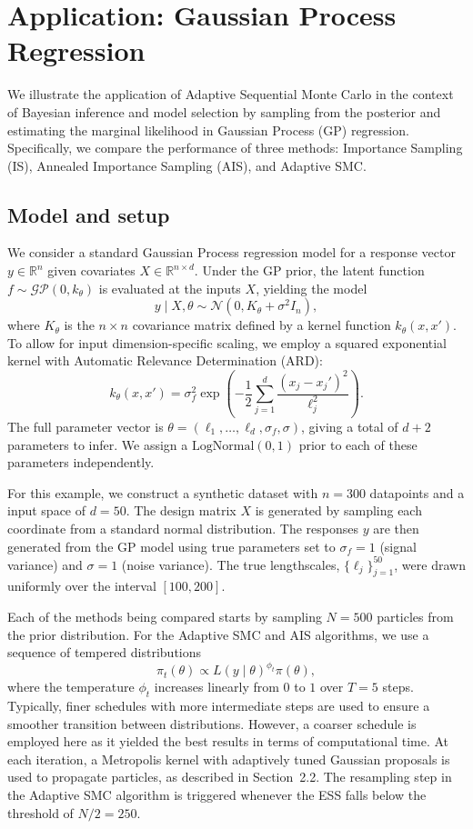 \documentclass[a4paper, 12pt]{article}
\begin{document}
    \section{Application: Gaussian Process Regression}

    We illustrate the application of Adaptive Sequential Monte Carlo in the context of Bayesian inference and model selection by sampling from the posterior and estimating the marginal likelihood in Gaussian Process (GP) regression. Specifically, we compare the performance of three methods: Importance Sampling (IS), Annealed Importance Sampling (AIS), and Adaptive SMC.

    \subsection{Model and setup}

    We consider a standard Gaussian Process regression model for a response vector $y \in \mathbb{R}^n$ given covariates $X \in \mathbb{R}^{n \times d}$. Under the GP prior, the latent function $f \sim \mathcal{GP}(0, k_\theta)$ is evaluated at the inputs $X$, yielding the model
    \[
        y \mid X, \theta \sim \mathcal{N}(0, K_\theta + \sigma^2 I_n),
    \]
    where $K_\theta$ is the $n \times n$ covariance matrix defined by a kernel function $k_\theta(x, x')$. To allow for input dimension-specific scaling, we employ a squared exponential kernel with Automatic Relevance Determination (ARD):
    \[
        k_\theta(x, x') = \sigma_f^2 \exp\left( -\frac{1}{2} \sum_{j=1}^d \frac{(x_j - x_j')^2}{\ell_j^2} \right).
    \]
    The full parameter vector is $\theta = (\ell_1, \dots, \ell_d, \sigma_f, \sigma)$, giving a total of $d+2$ parameters to infer. We assign a $\mathrm{LogNormal}(0,1)$ prior to each of these parameters independently.

    For this example, we construct a synthetic dataset with $n=300$ datapoints and a input space of $d=50$. The design matrix $X$ is generated by sampling each coordinate from a standard normal distribution. The responses $y$ are then generated from the GP model using true parameters set to $\sigma_f = 1$ (signal variance) and $\sigma = 1$ (noise variance). The true lengthscales, $\{\ell_j\}_{j=1}^{50}$, were drawn uniformly over the interval $[100, 200]$.

    Each of the methods being compared starts by sampling $N=500$ particles from the prior distribution. For the Adaptive SMC and AIS algorithms, we use a sequence of tempered distributions
    \[
        \pi_t(\theta) \propto L(y \mid \theta)^{\phi_t} \pi(\theta),
    \]
    where the temperature $\phi_t$ increases linearly from $0$ to $1$ over $T = 5$ steps. Typically, finer schedules with more intermediate steps are used to ensure a smoother transition between distributions. However, a coarser schedule is employed here as it yielded the best results in terms of computational time. At each iteration, a Metropolis kernel with adaptively tuned Gaussian proposals is used to propagate particles, as described in Section~2.2. The resampling step in the Adaptive SMC algorithm is triggered whenever the ESS falls below the threshold of $N/2 = 250$.
\end{document}
